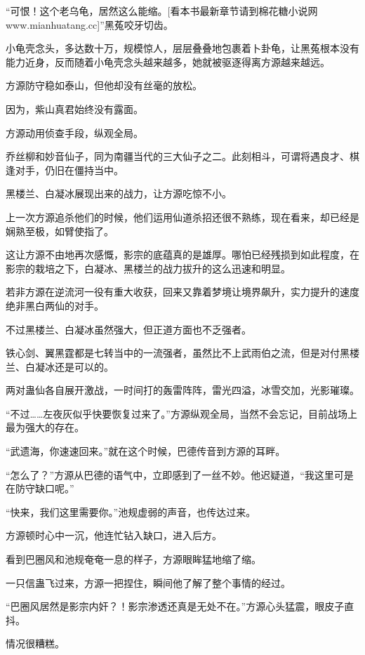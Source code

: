 
\begin{this_body}

“可恨！这个老乌龟，居然这么能缩。[看本书最新章节请到棉花糖小说网www.mianhuatang.cc]”黑菟咬牙切齿。

小龟壳念头，多达数十万，规模惊人，层层叠叠地包裹着卜卦龟，让黑菟根本没有能力近身，反而随着小龟壳念头越来越多，她就被驱逐得离方源越来越远。

方源防守稳如泰山，但他却没有丝毫的放松。

因为，紫山真君始终没有露面。

方源动用侦查手段，纵观全局。

乔丝柳和妙音仙子，同为南疆当代的三大仙子之二。此刻相斗，可谓将遇良才、棋逢对手，仍旧在僵持当中。

黑楼兰、白凝冰展现出来的战力，让方源吃惊不小。

上一次方源追杀他们的时候，他们运用仙道杀招还很不熟练，现在看来，却已经是娴熟至极，如臂使指了。

这让方源不由地再次感慨，影宗的底蕴真的是雄厚。哪怕已经残损到如此程度，在影宗的栽培之下，白凝冰、黑楼兰的战力拔升的这么迅速和明显。

若非方源在逆流河一役有重大收获，回来又靠着梦境让境界飙升，实力提升的速度绝非黑白两仙的对手。

不过黑楼兰、白凝冰虽然强大，但正道方面也不乏强者。

铁心剑、翼黑霆都是七转当中的一流强者，虽然比不上武雨伯之流，但是对付黑楼兰、白凝冰还是可以的。

两对蛊仙各自展开激战，一时间打的轰雷阵阵，雷光四溢，冰雪交加，光影璀璨。

“不过……左夜灰似乎快要恢复过来了。”方源纵观全局，当然不会忘记，目前战场上最为强大的存在。

“武遗海，你速速回来。”就在这个时候，巴德传音到方源的耳畔。

“怎么了？”方源从巴德的语气中，立即感到了一丝不妙。他迟疑道，“我这里可是在防守缺口呢。”

“快来，我们这里需要你。”池规虚弱的声音，也传达过来。

方源顿时心中一沉，他连忙钻入缺口，进入后方。

看到巴圈风和池规奄奄一息的样子，方源眼眸猛地缩了缩。

一只信蛊飞过来，方源一把捏住，瞬间他了解了整个事情的经过。

“巴圈风居然是影宗内奸？！影宗渗透还真是无处不在。”方源心头猛震，眼皮子直抖。

情况很糟糕。


\end{this_body}
